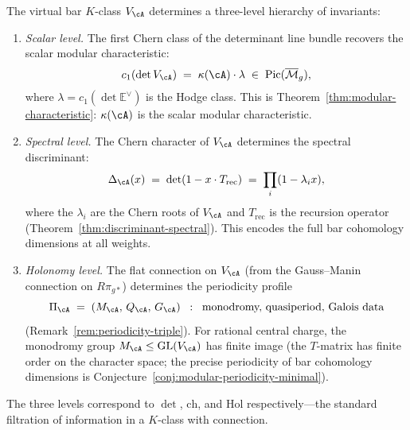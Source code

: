\begin{proposition}\label{prop:characteristic-hierarchy}
The virtual bar $K$-class $V_\cA$ determines a three-level
hierarchy of invariants:
\begin{enumerate}[label=\textup{(L\arabic*)}]
\item \emph{Scalar level.}
  The first Chern class of the determinant line bundle recovers the
  scalar modular characteristic:
  \[
  c_1(\det V_\cA)
  \;=\;
  \kappa(\cA) \cdot \lambda
  \;\in\; \operatorname{Pic}(\overline{\mathcal{M}}_g),
  \]
  where $\lambda = c_1(\det \mathbb{E}^\vee)$ is the Hodge class.
  This is Theorem~\textup{\ref{thm:modular-characteristic}}:
  $\kappa(\cA)$ is the scalar modular characteristic.

\item \emph{Spectral level.}
  The Chern character of $V_\cA$ determines the spectral
  discriminant:
  \[
  \Delta_\cA(x)
  \;=\;
  \det(1 - x \cdot T_{\mathrm{rec}})
  \;=\;
  \prod_i (1 - \lambda_i x),
  \]
  where the $\lambda_i$ are the Chern roots of $V_\cA$
  and $T_{\mathrm{rec}}$ is the recursion operator
  \textup{(}Theorem~\textup{\ref{thm:discriminant-spectral})}.
  This encodes the full bar cohomology dimensions at all weights.

\item \emph{Holonomy level.}
  The flat connection on $V_\cA$ (from the Gauss--Manin connection
  on $R\pi_{g*}$) determines the periodicity profile
  \[
  \Pi_\cA \;=\; (M_\cA,\, Q_\cA,\, G_\cA)
  \;\;:\;\;
  \text{monodromy, quasiperiod, Galois data}
  \]
  \textup{(}Remark~\textup{\ref{rem:periodicity-triple})}.
  For rational central charge, the monodromy group
  $M_\cA \leq \mathrm{GL}(V_\cA)$ has finite image
  (the $T$-matrix has finite order on the character space;
  the precise periodicity of bar cohomology dimensions is
  Conjecture~\ref{conj:modular-periodicity-minimal}).
\end{enumerate}
The three levels correspond to $\det$, $\mathrm{ch}$, and
$\mathrm{Hol}$ respectively---the standard filtration of
information in a $K$-class with connection.
\end{proposition}

